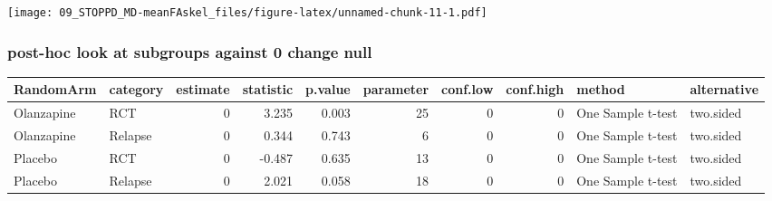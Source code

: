 \documentclass[]{article}
\newenvironment{Shaded}{\begin{snugshade}}{\end{snugshade}}
\newcommand{\KeywordTok}[1]{\textcolor[rgb]{0.13,0.29,0.53}{\textbf{#1}}}
\newcommand{\DataTypeTok}[1]{\textcolor[rgb]{0.13,0.29,0.53}{#1}}
\newcommand{\DecValTok}[1]{\textcolor[rgb]{0.00,0.00,0.81}{#1}}
\newcommand{\StringTok}[1]{\textcolor[rgb]{0.31,0.60,0.02}{#1}}
\newcommand{\OperatorTok}[1]{\textcolor[rgb]{0.81,0.36,0.00}{\textbf{#1}}}
\newcommand{\NormalTok}[1]{#1}
\theoremstyle{definition}
\theoremstyle{definition}
\theoremstyle{definition}
\theoremstyle{remark}
\begin{document}
\texttt{[image: 09\_STOPPD\_MD-meanFAskel\_files/figure-latex/unnamed-chunk-11-1.pdf]}

\subsubsection{post-hoc look at subgroups against 0 change
null}\label{post-hoc-look-at-subgroups-against-0-change-null}

\begin{Shaded}
\end{Shaded}

\begin{tabular}{l|l|r|r|r|r|r|r|l|l}
\hline
RandomArm & category & estimate & statistic & p.value & parameter & conf.low & conf.high & method & alternative\\
\hline
Olanzapine & RCT & 0 & 3.235 & 0.003 & 25 & 0 & 0 & One Sample t-test & two.sided\\
\hline
Olanzapine & Relapse & 0 & 0.344 & 0.743 & 6 & 0 & 0 & One Sample t-test & two.sided\\
\hline
Placebo & RCT & 0 & -0.487 & 0.635 & 13 & 0 & 0 & One Sample t-test & two.sided\\
\hline
Placebo & Relapse & 0 & 2.021 & 0.058 & 18 & 0 & 0 & One Sample t-test & two.sided\\
\hline
\end{tabular}
\end{document}

